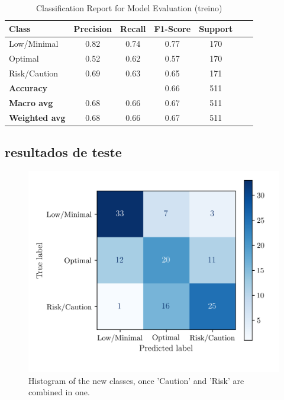 \documentclass[conference]{IEEEtran}
\begin{document}
\begin{table}[H]
\centering
\caption{Classification Report for Model Evaluation (treino)}
\begin{tabular}{lcccccc}
\toprule
\textbf{Class} & \textbf{Precision} & \textbf{Recall} & \textbf{F1-Score} & \textbf{Support} \\
\midrule
Low/Minimal & 0.82 & 0.74 & 0.77 & 170 \\
Optimal & 0.52 & 0.62 & 0.57 & 170 \\
Risk/Caution & 0.69 & 0.63 & 0.65 & 171 \\
\midrule
\textbf{Accuracy} &  &  & 0.66 & 511 \\
\textbf{Macro avg} & 0.68 & 0.66 & 0.67 & 511 \\
\textbf{Weighted avg} & 0.68 & 0.66 & 0.67 & 511 \\
\bottomrule
\end{tabular}
\end{table}

\subsection{resultados de teste}

\begin{figure}[H]
    \centering
    \includegraphics[width=1\linewidth]{assets/DTREE_ConfusionMatrixTest.png}
    \caption{Histogram of the new classes, once 'Caution' and 'Risk' are combined in one.}
    \label{dtree_cmtest}
\end{figure}
\end{document}
